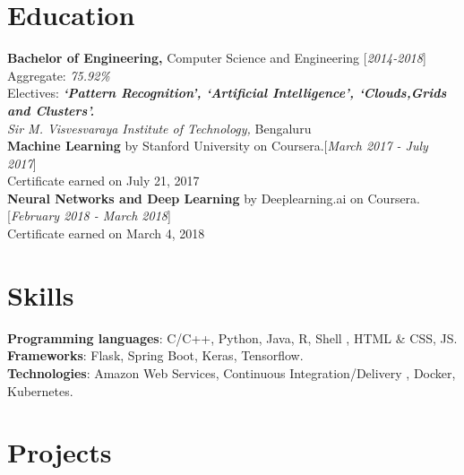 \documentclass[10pt]{article}
\renewcommand{\textbf}[1]{{\bfseries\color{accent_darkest}#1}}
\begin{document}
\section*{Education} \textbf{Bachelor of Engineering,} Computer Science
and Engineering \hfill \textcolor{grey_darker}{[\textit{2014-2018}]}\\
Aggregate: \textit{75.92\%}\\
Electives: \textbf{\textit{`Pattern Recognition', `Artificial Intelligence',
`Clouds,Grids and Clusters'.}}\\
\textit{Sir M. Visvesvaraya Institute of Technology,} Bengaluru
\medskip
\\
\textbf{Machine Learning} by Stanford University on Coursera.\hfill  \textcolor{grey_darker}{[\textit
{March 2017 - July 2017}]}\\
Certificate earned on July 21, 2017
\medskip\\ 
\textbf{Neural Networks and Deep Learning} by Deeplearning.ai on Coursera.\hfill  \textcolor{grey_darker}{[\textit
{February 2018 - March 2018}]}\\
Certificate earned on March 4, 2018 

\section*{Skills} 
\textbf{Programming languages}: C/C++, Python, Java, R, Shell , HTML \& CSS, JS.\\
\textbf{Frameworks}: Flask, Spring Boot, Keras, Tensorflow.\\
\textbf{Technologies}: Amazon Web Services, Continuous Integration/Delivery , Docker, Kubernetes. 

\section*{Projects}
\end{document}

